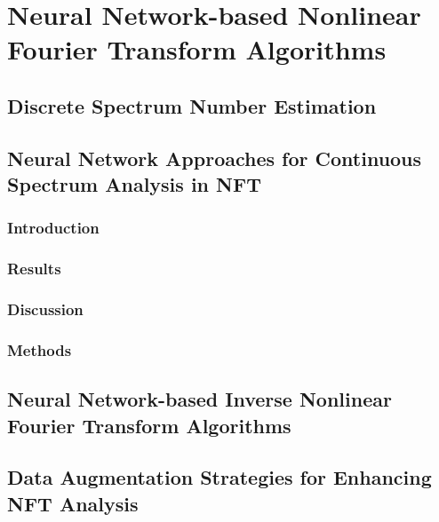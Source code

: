 \chapter{Neural Network-based Nonlinear Fourier Transform Algorithms}

\section{Discrete Spectrum Number Estimation}

\lipsum[1]


\section{Neural Network Approaches for Continuous Spectrum Analysis in NFT}

\subsection{Introduction}


\subsection{Results}


\subsection{Discussion}


\subsection{Methods}



\section{Neural Network-based Inverse Nonlinear Fourier Transform Algorithms}

\lipsum[1]

\section{Data Augmentation Strategies for Enhancing NFT Analysis}

\lipsum[1]

